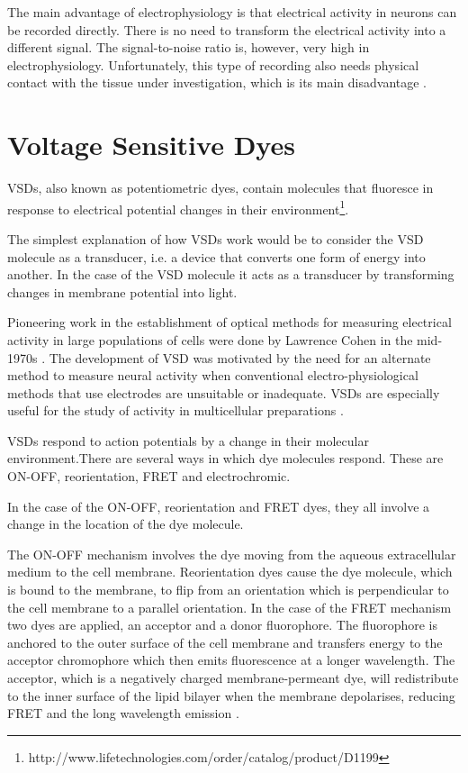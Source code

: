 
The main advantage of electrophysiology is that electrical activity in neurons can be recorded directly. There is no need to transform the electrical activity into a different signal. The signal-to-noise ratio is, however, very high in electrophysiology. Unfortunately, this type of recording also needs physical contact with the tissue under investigation, which is its main disadvantage \cite{Scanziani2009}.

\section{Voltage Sensitive Dyes}

\Acp{VSD}, also known as potentiometric dyes, contain molecules that fluoresce in response to electrical potential changes in their environment\footnote{http://www.lifetechnologies.com/order/catalog/product/D1199}. 

The simplest explanation of how \acp{VSD} work would be to consider the \ac{VSD} molecule as a transducer, i.e. a device that converts one form of energy into another. In the case of the \ac{VSD} molecule it acts as a transducer by transforming changes in membrane potential into light.

Pioneering work in the establishment of optical methods for measuring electrical activity in large populations of cells were done by Lawrence Cohen in the mid-1970s \cite{Canepari2011, Cohen1974}. The development of \ac{VSD} was motivated by the need for an alternate method to measure neural activity when conventional electro-physiological methods that use electrodes are unsuitable or inadequate. \acp{VSD} are especially useful for the study of activity in multicellular preparations \cite{Loew1996}.

\Acp{VSD} respond to action potentials by a change in their molecular environment.There are several ways in which dye molecules respond. These are ON-OFF, reorientation, \ac{FRET} and electrochromic.

In the case of the ON-OFF, reorientation and \ac{FRET} dyes, they all involve a change in the location of the dye molecule. 

The ON-OFF mechanism involves the dye moving from the aqueous extracellular medium to the cell membrane. Reorientation dyes cause the dye molecule, which is bound to the membrane, to flip from an orientation which is perpendicular to the cell membrane to a parallel orientation. In the case of the \ac{FRET} mechanism two dyes are applied, an acceptor and a donor fluorophore. The fluorophore is anchored to the outer surface of the cell membrane and transfers energy to the acceptor chromophore which then emits fluorescence at a longer wavelength. The acceptor, which is a negatively charged membrane-permeant dye, will redistribute to the inner surface of the lipid bilayer when the membrane depolarises, reducing \ac{FRET} and the long wavelength emission \cite{Loew2011}.

